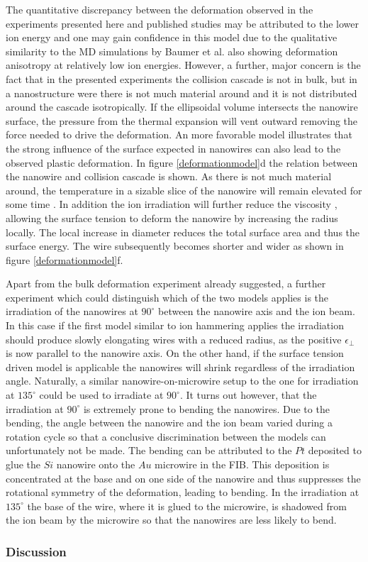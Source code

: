 The quantitative discrepancy between the deformation observed in the experiments presented here and published studies may be attributed to the lower ion energy and one may gain confidence in this model due to the qualitative similarity to the MD simulations by Baumer et al. \cite{baumer_prediction_2014} also showing deformation anisotropy at relatively low ion energies. However, a further, major concern is the fact that in the presented experiments the collision cascade is not in bulk, but in a nanostructure were there is not much material around and it is not distributed around the cascade isotropically. If the ellipsoidal volume intersects the nanowire surface, the pressure from the thermal expansion will vent outward removing the force needed to drive the deformation. An more favorable model illustrates that the strong influence of the surface expected in nanowires can also lead to the observed plastic deformation. In figure \ref{deformationmodel}d the relation between the nanowire and collision cascade is shown. As there is not much material around, the temperature in a sizable slice of the nanowire will remain elevated for some time \cite{borschel_ion-solid_2012,greaves_enhanced_2013,anders_sputtering_2015,johannes_ion_2015}. In addition the ion irradiation will further reduce the viscosity \cite{snoeks_stress_1997,hu_burrowing_2002,mayr_mechanisms_2003}, allowing the surface tension to deform the nanowire by increasing the radius locally. The local increase in diameter reduces the total surface area and thus the surface energy. The wire subsequently becomes shorter and wider as shown in figure \ref{deformationmodel}f. 

Apart from the bulk deformation experiment already suggested, a further experiment which could distinguish which of the two models applies is the irradiation of the nanowires at $90^\circ$ between the nanowire axis and the ion beam. In this case if the first model similar to ion hammering applies the irradiation should produce slowly elongating wires with a reduced radius, as the positive $\epsilon_{\perp}$ is now parallel to the nanowire axis. On the other hand, if the surface tension driven model is applicable the nanowires will shrink regardless of the irradiation angle. Naturally, a similar nanowire-on-microwire setup to the one for irradiation at $135^\circ$ could be used to irradiate at $90^\circ$. It turns out however, that the irradiation at $90^\circ$ is extremely prone to bending the nanowires. Due to the bending, the angle between the nanowire and the ion beam varied during a rotation cycle so that a conclusive discrimination between the models can unfortunately not be made. The bending can be attributed to the $Pt$ deposited to glue the $Si$ nanowire onto the $Au$ microwire in the FIB. This deposition is concentrated at the base and on one side of the nanowire and thus suppresses the rotational symmetry of the deformation, leading to bending. In the irradiation at $135^\circ$ the base of the wire, where it is glued to the microwire, is shadowed from the ion beam by the microwire so that the nanowires are less likely to bend. 


\subsubsection{Discussion}